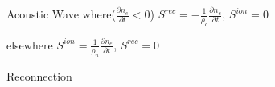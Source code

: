 \documentclass{beamer}
\begin{document}
\begin{frame}{Acoustic Wave}
     where($\frac{\partial n_e}{\partial t} <0$) $S^{rec} = -\frac{1}{\rho_c} \frac{\partial n_e}{\partial t} $, $S^{ion} = 0 $

     elsewhere $S^{ion} = \frac{1}{\rho_n} \frac{\partial n_e}{\partial t} $, $S^{rec} = 0 $

\end{frame}
\begin{frame}{Reconnection}
\end{frame}
\end{document}
